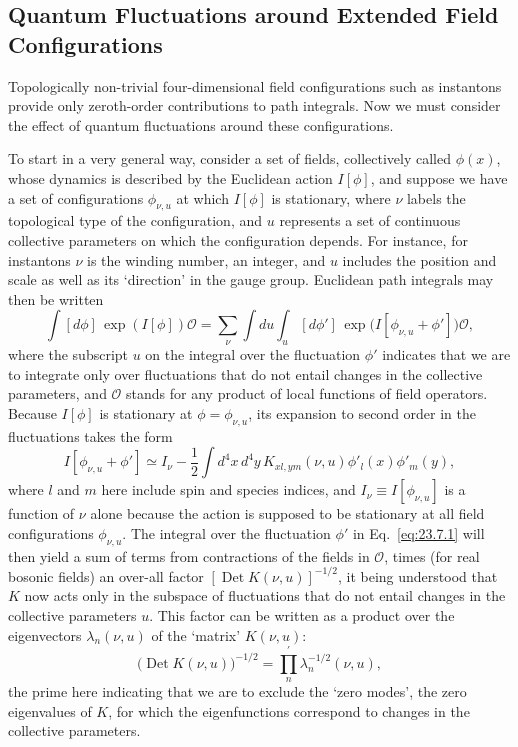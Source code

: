 \subsection{Quantum Fluctuations around Extended Field Configurations}
\label{sec:23.7}

Topologically non-trivial four-dimensional field configurations such as
instantons provide only zeroth-order contributions to path integrals.
Now we must consider the effect of quantum fluctuations around these
configurations.

To start in a very general way, consider a set of fields, collectively
called $\phi(x)$, whose dynamics is described by the Euclidean action
$I[\phi]$, and suppose we have a set of configurations $\phi_{\nu,u}$ at
which $I[\phi]$ is stationary, where $\nu$ labels the topological type of
the configuration, and $u$ represents a set of continuous collective
parameters on which the configuration depends. For instance, for
instantons $\nu$ is the winding number, an integer, and $u$ includes the
position and scale as well as its `direction' in the gauge group.
Euclidean path integrals may then be written
\begin{equation}
\int[d\phi]\,\exp(I[\phi])\mathcal O
=\sum_\nu\int du\int_u[d\phi']\,
\exp\bigl(I[\phi_{\nu,u}+\phi']\bigr)\mathcal O,
\tag{23.7.1}\label{eq:23.7.1}
\end{equation}
where the subscript $u$ on the integral over the fluctuation $\phi'$
indicates that we are to integrate only over fluctuations that do not
entail changes in the collective parameters, and $\mathcal O$ stands for
any product of local functions of field operators. Because $I[\phi]$ is
stationary at $\phi=\phi_{\nu,u}$, its expansion to second order in the
fluctuations takes the form
\begin{equation}
I[\phi_{\nu,u}+\phi']\simeq I_\nu
-\frac12\int d^4x\,d^4y\,
K_{xl,ym}(\nu,u)\phi'_l(x)\phi'_m(y),
\tag{23.7.2}\label{eq:23.7.2}
\end{equation}
where $l$ and $m$ here include spin and species indices, and
$I_\nu\equiv I[\phi_{\nu,u}]$ is a function of $\nu$ alone because the action
is supposed to be stationary at all field configurations
$\phi_{\nu,u}$. The integral over the fluctuation $\phi'$ in
Eq.~\eqref{eq:23.7.1} will then yield a sum of terms from contractions
of the fields in $\mathcal O$, times (for real bosonic fields) an
over-all factor $[\operatorname{Det}K(\nu,u)]^{-1/2}$, it being
understood that $K$ now acts only in the subspace of fluctuations that
do not entail changes in the collective parameters $u$. This factor can
be written as a product over the eigenvectors $\lambda_n(\nu,u)$ of the
`matrix' $K(\nu,u)$:
\begin{equation}
\bigl(\operatorname{Det}K(\nu,u)\bigr)^{-1/2}
=\prod_n^{\prime}\lambda_n^{-1/2}(\nu,u),
\tag{23.7.3}\label{eq:23.7.3}
\end{equation}
the prime here indicating that we are to exclude the `zero modes', the
zero eigenvalues of $K$, for which the eigenfunctions correspond to
changes in the collective parameters.

